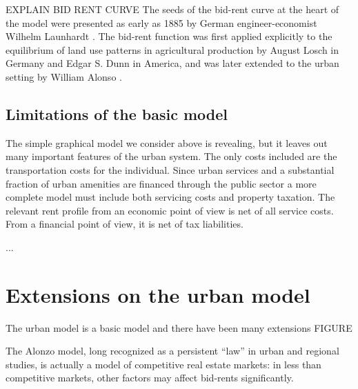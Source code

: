 EXPLAIN BID RENT CURVE
 The seeds of the \gls{bid-rent curve} at the heart of the model were presented as early as 1885  by German engineer-economist Wilhelm Launhardt \cite{blaugEconomicTheoryRetrospect1985, launhardtMathematischeBegruendungVolkswirthschaftslehre1885}. The  \gls{bid-rent function} was first applied explicitly to the equilibrium of land use patterns in agricultural production by August Losch \cite{loschEconomicsLocation1954} in Germany and Edgar S. Dunn \cite{dunnEquilibriumLandUsePatterns1954} in America, and was later extended to the urban setting by William Alonso \cite{alonsoModelUrbanLand1960}. 
 
\subsection{Limitations of the basic model}
The simple graphical model we consider above is revealing, but it leaves out many important features of the urban system. The only costs included are the transportation costs for the individual.  Since urban services and  a substantial fraction of urban amenities are financed through the public sector a more complete model must include both servicing costs and property taxation. The relevant rent profile from an economic point of view is net of all service costs. From a financial point of view, it is net of tax liabilities.%

...

\section{Extensions on the urban model}

The urban model is a basic model and there have been many extensions FIGURE


The Alonzo model, long  recognized as a persistent ``law'' in urban and regional studies, 
is actually a model of competitive real estate markets: in less than competitive markets, other factors may affect bid-rents significantly.

